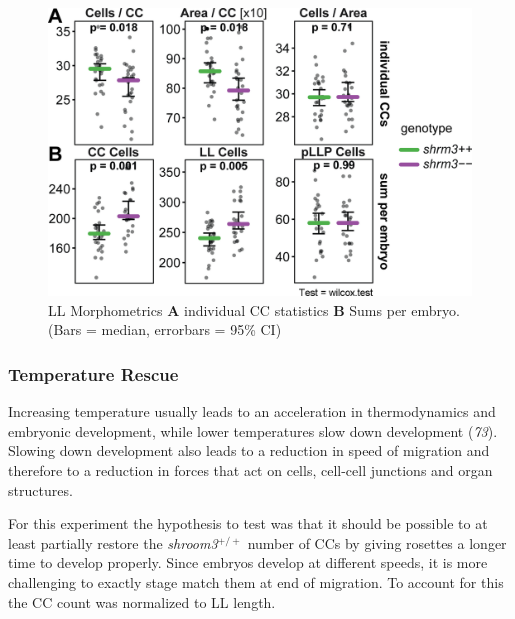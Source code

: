 \documentclass[10pt, b5paper, singlespacinge, twoside]{reedthesis} %
\theoremstyle{definition}
\theoremstyle{definition}
\theoremstyle{definition}
\theoremstyle{remark}
\begin{document}
\begin{figure}[H]

{\centering \includegraphics[width=0.65\linewidth]{figures/results/01_morphometrics/ll_clusters} 

}

\caption[LL Morphometrics]{LL Morphometrics \textbf{A} individual CC statistics \textbf{B} Sums per embryo. (Bars = median, errorbars = 95\% CI)}\label{fig:llclus}
\end{figure}
\hypertarget{res-tempresc}{%
\subsubsection{Temperature Rescue}\label{res-tempresc}}

Increasing temperature usually leads to an acceleration in thermodynamics and embryonic development, while lower temperatures slow down development (\emph{73}). Slowing down development also leads to a reduction in speed of migration and therefore to a reduction in forces that act on cells, cell-cell junctions and organ structures.

For this experiment the hypothesis to test was that it should be possible to at least partially restore the \emph{shroom3}\(^{+/+}\) number of CCs by giving rosettes a longer time to develop properly. Since embryos develop at different speeds, it is more challenging to exactly stage match them at end of migration. To account for this the CC count was normalized to LL length.
\end{document}

